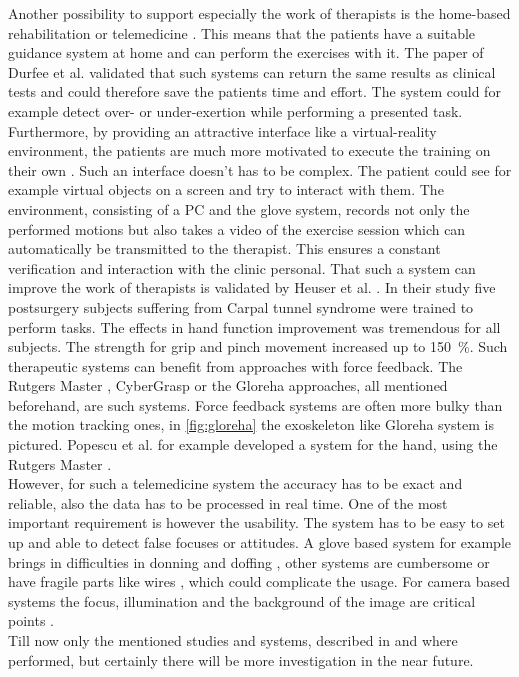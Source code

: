 Another possibility to support especially the work of therapists is the home-based rehabilitation or telemedicine \cite{metcalf2013markerless}. This means that the patients have a suitable guidance system at home and can perform the exercises with it. The paper of Durfee et al. \cite{durfee2007technical} validated that such systems can return the same results as clinical tests and could therefore save the patients time and effort. The system could for example detect over- or under-exertion while performing a presented task. Furthermore, by providing an attractive interface like a virtual-reality environment, the patients are much more motivated to execute the training on their own \cite{popescu2000virtual}. Such an interface doesn't has to be complex. The patient could see for example virtual objects on a screen and try to interact with them. The environment, consisting of a PC and the glove system, records not only the performed motions but also takes a video of the exercise session which can automatically be transmitted to the therapist. This ensures a constant verification and interaction with the clinic personal. That such a system can improve the work of therapists is validated by Heuser et al. \cite{heuser2007telerehabilitation}. In their study five postsurgery subjects suffering from Carpal tunnel syndrome were trained to perform tasks. The effects in hand function improvement was tremendous for all subjects. The strength for grip and pinch movement increased up to \SI{150}{\percent}. Such therapeutic systems can benefit from approaches with force feedback. The Rutgers Master , CyberGrasp or the Gloreha approaches, all mentioned beforehand, are such systems. Force feedback systems are often more bulky than the motion tracking ones, in \ref{fig:gloreha} the exoskeleton like Gloreha system is pictured. Popescu et al. \cite{popescu2000virtual} for example developed a system for the hand, using the Rutgers Master .\\ 
However, for such a telemedicine system the accuracy has to be exact and reliable, also the data has to be processed in real time. One of the most important requirement is however the usability. The system has to be easy to set up and able to detect false focuses or attitudes. A glove based system for example brings in difficulties in donning and doffing \cite{metcalf2013markerless}, other systems are cumbersome or have fragile parts like wires \cite{bouzit2002rutgers}, which could complicate the usage. For camera based systems the focus, illumination and the background of the image are critical points \cite{ionescu2005dynamic}.\\
Till now only the mentioned studies and systems, described in \cite{heuser2007telerehabilitation} and \cite{popescu2000virtual} where performed, but certainly there will be more investigation in the near future.


